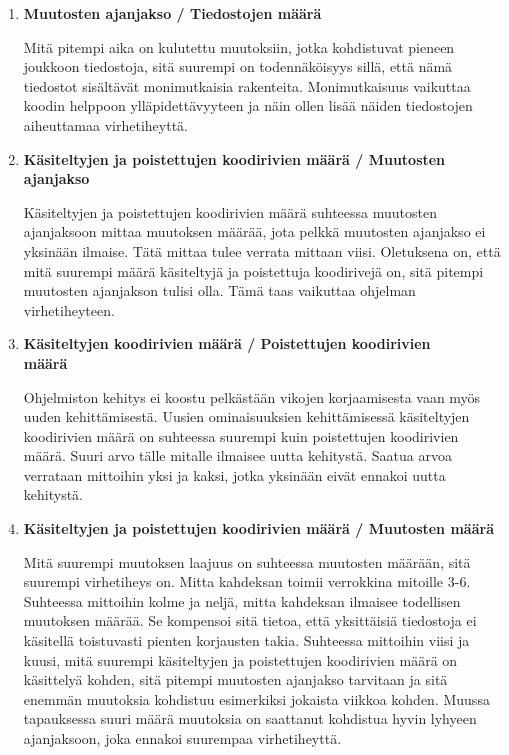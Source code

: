 \documentclass[finnish]{../tktltiki2}
\theoremstyle{definition}
\theoremstyle{remark}
\begin{document}
\begin{enumerate}
    \item {\bf Muutosten ajanjakso / Tiedostojen määrä}
    
    Mitä pitempi aika on kulutettu muutoksiin, jotka kohdistuvat pieneen joukkoon tiedostoja, sitä suurempi on todennäköisyys sillä, että nämä tiedostot sisältävät monimutkaisia rakenteita. Monimutkaisuus vaikuttaa koodin helppoon ylläpidettävyyteen ja näin ollen lisää näiden tiedostojen aiheuttamaa virhetiheyttä.

    \item {\bf Käsiteltyjen ja poistettujen koodirivien määrä / Muutosten ajanjakso}
    
    Käsiteltyjen ja poistettujen koodirivien määrä suhteessa muutosten ajanjaksoon mittaa muutoksen määrää, jota pelkkä muutosten ajanjakso ei yksinään ilmaise. Tätä mittaa tulee verrata mittaan viisi. Oletuksena on, että mitä suurempi määrä käsiteltyjä ja poistettuja koodirivejä on, sitä pitempi muutosten ajanjakson tulisi olla. Tämä taas vaikuttaa ohjelman virhetiheyteen.

    \item {\bf Käsiteltyjen koodirivien määrä / Poistettujen koodirivien\\määrä}
    
    Ohjelmiston kehitys ei koostu pelkästään vikojen korjaamisesta vaan myös uuden kehittämisestä. Uusien ominaisuuksien kehittämisessä käsiteltyjen koodirivien määrä on suhteessa suurempi kuin poistettujen koodirivien määrä. Suuri arvo tälle mitalle ilmaisee uutta kehitystä. Saatua arvoa verrataan mittoihin yksi ja kaksi, jotka yksinään eivät ennakoi uutta kehitystä.

    \item {\bf Käsiteltyjen ja poistettujen koodirivien määrä / Muutosten määrä}
    
    Mitä suurempi muutoksen laajuus on suhteessa muutosten määrään, sitä suurempi virhetiheys on. Mitta kahdeksan toimii verrokkina mitoille 3-6. Suhteessa mittoihin kolme ja neljä, mitta kahdeksan ilmaisee todellisen muutoksen määrää. Se kompensoi sitä tietoa, että yksittäisiä tiedostoja ei käsitellä toistuvasti pienten korjausten takia. Suhteessa mittoihin viisi ja kuusi, mitä suurempi käsiteltyjen ja poistettujen koodirivien määrä on käsittelyä kohden, sitä pitempi muutosten ajanjakso tarvitaan ja sitä enemmän muutoksia kohdistuu esimerkiksi jokaista viikkoa kohden. Muussa tapauksessa suuri määrä muutoksia on saattanut kohdistua hyvin lyhyeen ajanjaksoon, joka ennakoi suurempaa virhetiheyttä.

\end{enumerate}
\end{document}

